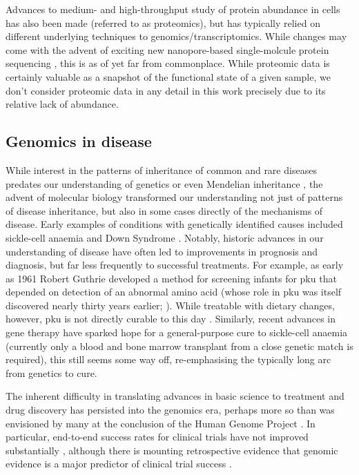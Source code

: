 \documentclass[thesis.tex]{subfiles}
\begin{document}
Advances to medium- and high-throughput study of protein abundance in cells has also been made (referred to as proteomics), but has typically relied on different underlying techniques to genomics/transcriptomics. While changes may come with the advent of exciting new nanopore-based single-molcule protein sequencing \citep{afshar_bakshloo_nanopore-based_2022, motone_not_2023}, this is as of yet far from commonplace. While proteomic data is certainly valuable as a snapshot of the functional state of a given sample, we don't consider proteomic data in any detail in this work precisely due to its relative lack of abundance. 


\subsection{Genomics in disease}
While interest in the patterns of inheritance of common and rare diseases predates our understanding of genetics or even Mendelian inheritance \citep{emery_joseph_1989}, the advent of molecular biology transformed our understanding not just of patterns of disease inheritance, but also in some cases directly of the mechanisms of disease. Early examples of conditions with genetically identified causes included sickle-cell anaemia \citep{ingram_specific_1956} and Down Syndrome \citep{lejeune_human_1959}. Notably, historic advances in our understanding of disease have often led to improvements in prognosis and diagnosis, but far less frequently to successful treatments. For example, as early as 1961 Robert Guthrie developed a method for screening infants for \gls{pku} that depended on detection of an abnormal amino acid (whose role in \gls{pku} was itself discovered nearly thirty years earlier; \citealp{folling_uber_1934}). While treatable with dietary changes, however, \gls{pku} is not directly curable to this day \citep{mohanty_century_2014}. Similarly, recent advances in gene therapy have sparked hope for a general-purpose cure to sickle-cell anaemia (currently only a blood and bone marrow transplant from a close genetic match is required), this still seems some way off, re-emphasising the typically long arc from genetics to cure.

The inherent difficulty in translating advances in basic science to treatment and drug discovery has persisted into the genomics era, perhaps more so than was envisioned by many at the conclusion of the Human Genome Project \citep{emilien_impact_2000}. In particular, end-to-end success rates for clinical trials have not improved substantially \citep{dowden_trends_2019}, although there is mounting retrospective evidence that genomic evidence is a major predictor of clinical trial success \citep{nelson_support_2015, king_are_2019}.
\end{document}
